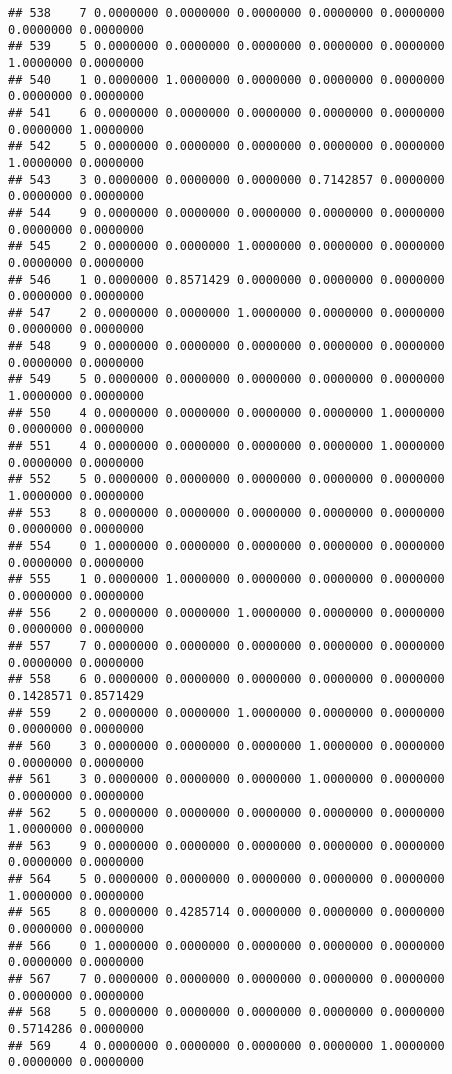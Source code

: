 \documentclass[
]{article}
\begin{document}
\begin{verbatim}
## 538    7 0.0000000 0.0000000 0.0000000 0.0000000 0.0000000 0.0000000 0.0000000
## 539    5 0.0000000 0.0000000 0.0000000 0.0000000 0.0000000 1.0000000 0.0000000
## 540    1 0.0000000 1.0000000 0.0000000 0.0000000 0.0000000 0.0000000 0.0000000
## 541    6 0.0000000 0.0000000 0.0000000 0.0000000 0.0000000 0.0000000 1.0000000
## 542    5 0.0000000 0.0000000 0.0000000 0.0000000 0.0000000 1.0000000 0.0000000
## 543    3 0.0000000 0.0000000 0.0000000 0.7142857 0.0000000 0.0000000 0.0000000
## 544    9 0.0000000 0.0000000 0.0000000 0.0000000 0.0000000 0.0000000 0.0000000
## 545    2 0.0000000 0.0000000 1.0000000 0.0000000 0.0000000 0.0000000 0.0000000
## 546    1 0.0000000 0.8571429 0.0000000 0.0000000 0.0000000 0.0000000 0.0000000
## 547    2 0.0000000 0.0000000 1.0000000 0.0000000 0.0000000 0.0000000 0.0000000
## 548    9 0.0000000 0.0000000 0.0000000 0.0000000 0.0000000 0.0000000 0.0000000
## 549    5 0.0000000 0.0000000 0.0000000 0.0000000 0.0000000 1.0000000 0.0000000
## 550    4 0.0000000 0.0000000 0.0000000 0.0000000 1.0000000 0.0000000 0.0000000
## 551    4 0.0000000 0.0000000 0.0000000 0.0000000 1.0000000 0.0000000 0.0000000
## 552    5 0.0000000 0.0000000 0.0000000 0.0000000 0.0000000 1.0000000 0.0000000
## 553    8 0.0000000 0.0000000 0.0000000 0.0000000 0.0000000 0.0000000 0.0000000
## 554    0 1.0000000 0.0000000 0.0000000 0.0000000 0.0000000 0.0000000 0.0000000
## 555    1 0.0000000 1.0000000 0.0000000 0.0000000 0.0000000 0.0000000 0.0000000
## 556    2 0.0000000 0.0000000 1.0000000 0.0000000 0.0000000 0.0000000 0.0000000
## 557    7 0.0000000 0.0000000 0.0000000 0.0000000 0.0000000 0.0000000 0.0000000
## 558    6 0.0000000 0.0000000 0.0000000 0.0000000 0.0000000 0.1428571 0.8571429
## 559    2 0.0000000 0.0000000 1.0000000 0.0000000 0.0000000 0.0000000 0.0000000
## 560    3 0.0000000 0.0000000 0.0000000 1.0000000 0.0000000 0.0000000 0.0000000
## 561    3 0.0000000 0.0000000 0.0000000 1.0000000 0.0000000 0.0000000 0.0000000
## 562    5 0.0000000 0.0000000 0.0000000 0.0000000 0.0000000 1.0000000 0.0000000
## 563    9 0.0000000 0.0000000 0.0000000 0.0000000 0.0000000 0.0000000 0.0000000
## 564    5 0.0000000 0.0000000 0.0000000 0.0000000 0.0000000 1.0000000 0.0000000
## 565    8 0.0000000 0.4285714 0.0000000 0.0000000 0.0000000 0.0000000 0.0000000
## 566    0 1.0000000 0.0000000 0.0000000 0.0000000 0.0000000 0.0000000 0.0000000
## 567    7 0.0000000 0.0000000 0.0000000 0.0000000 0.0000000 0.0000000 0.0000000
## 568    5 0.0000000 0.0000000 0.0000000 0.0000000 0.0000000 0.5714286 0.0000000
## 569    4 0.0000000 0.0000000 0.0000000 0.0000000 1.0000000 0.0000000 0.0000000

\end{verbatim}
\end{document}
